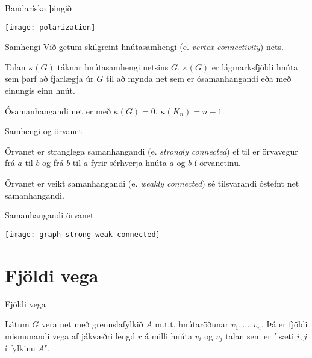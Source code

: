 \documentclass[handout]{beamer}
\begin{document}
\begin{frame}{Bandaríska þingið}
    \begin{center}
        \texttt{[image: polarization]}
    \end{center}
\end{frame}

\begin{frame}{Samhengi}
Við getum skilgreint hnútasamhengi (e. \emph{vertex connectivity}) nets.

\begin{tcolorbox}[title=Samhengi]
Talan $\kappa(G)$ táknar hnútasamhengi netsins $G$. $\kappa(G)$ er lágmarksfjöldi hnúta sem þarf að fjarlægja úr $G$ til að mynda net sem er ósamanhangandi eða með einungis einn hnút.
\end{tcolorbox}
Ósamanhangandi net er með $\kappa(G) = 0$. $\kappa(K_n) = n-1$.
\end{frame}

\begin{frame}{Samhengi og örvanet}
\begin{tcolorbox}[title=Stranglega samanhangandi örvanet]
Örvanet er stranglega samanhangandi (e. \emph{strongly connected}) ef til er örvavegur frá $a$ til $b$ og frá $b$ til $a$ fyrir sérhverja hnúta $a$ og $b$ í örvanetinu.
\end{tcolorbox}

\begin{tcolorbox}[title=Veikt samanhangandi örvanet]
Örvanet er veikt samanhangandi (e. \emph{weakly connected}) sé tilsvarandi óstefnt net samanhangandi.
\end{tcolorbox}
\end{frame}

\begin{frame}{Samanhangandi örvanet}
\begin{center}
\texttt{[image: graph-strong-weak-connected]}
\end{center}
\end{frame}
\section{Fjöldi vega}
\begin{frame}{Fjöldi vega}
\begin{tcolorbox}
Látum $G$ vera net með grennslafylkið $A$ m.t.t. hnútaröðunar $v_1, \ldots, v_n$. Þá er fjöldi mismunandi vega af jákvæðri lengd $r$ á milli hnúta $v_i$ og $v_j$ talan sem er í sæti $i,j$ í fylkinu $A^r$.
\end{tcolorbox}
\end{frame}
\end{document}
